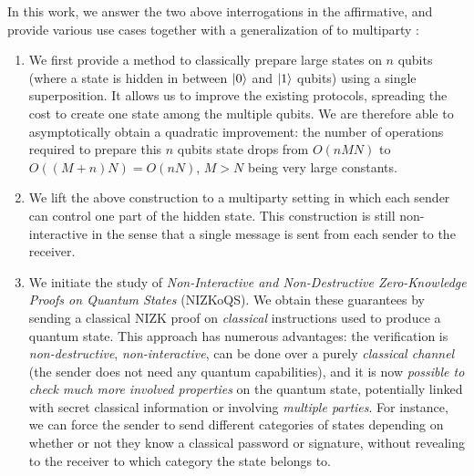 In this work, we answer the two above interrogations in the affirmative, and provide various use cases together with a generalization of \RSP{} to multiparty :
\begin{enumerate}[listparindent=\parindent]
  \item We first provide a method to classically prepare large states on $n$ qubits (where a \GHZ{} state is hidden in between $\ket{0}$ and $\ket{1}$ qubits) using a single superposition. It allows us to improve the existing \RSP{} protocols, spreading the cost to create one state among the multiple qubits. We are therefore able to asymptotically obtain a quadratic improvement: the number of operations required to prepare this $n$ qubits state drops from $O(nMN)$ to $O((M+n)N) = O(nN)$, $M > N$ being very large constants.
  \item We lift the above construction to a multiparty setting in which each sender can control one part of the hidden \GHZ{} state. This construction is still non-interactive in the sense that a single message is sent from each sender to the receiver.
  \item We initiate the study of \emph{Non-Interactive and Non-Destructive Zero-Knowledge Proofs on Quantum States} (NIZKoQS). We obtain these guarantees by sending a classical NIZK proof on \emph{classical} instructions used to produce a quantum state. This approach has numerous advantages: the verification is \emph{non-destructive}, \emph{non-interactive}, can be done over a purely \emph{classical channel} (the sender does not need any quantum capabilities), and it is now \emph{possible to check much more involved properties} on the quantum state, potentially linked with secret classical information or involving \emph{multiple parties}. For instance, we can force the sender to send different categories of states depending on whether or not they know a classical password or signature, without revealing to the receiver to which category the state belongs to.



\end{enumerate}
